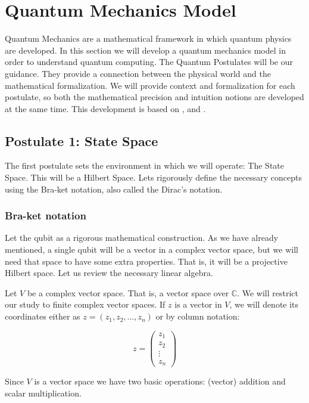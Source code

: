 \section{Quantum Mechanics Model}


Quantum Mechanics are a mathematical framework in which quantum physics are developed. In this section we will develop a quantum mechanics model in order to understand quantum computing. The Quantum Postulates will be our guidance. They provide a connection between the physical world and the mathematical formalization. We will provide context and formalization for each postulate, so both the mathematical precision and intuition notions are developed at the same time. This development is based on \cite{Nielsen2002}, \cite{Manzano2020} and \cite{Bayens2019}.


\subsection{Postulate 1: State Space}


The first postulate sets the environment in which we will operate: The State Space. This will be a Hilbert Space. Lets rigorously define the necessary concepts using the Bra-ket notation, also called the Dirac's notation.


\subsubsection{Bra-ket notation}


Let the qubit as a rigorous mathematical construction. As we have already mentioned, a single qubit will be a vector in a complex vector space, but we will need that space to have some extra properties. That is, it will be a projective Hilbert space. Let us review the necessary linear algebra.

Let $V$ be a complex vector space. That is, a vector space over $\mathds{C}$. We will restrict our study to finite complex vector spaces. If $z$ is a vector in $V$, we will denote its coordinates either as $z = (z_1, z_2, \dotsc, z_n)$ or by column notation:

$$ z = 
\begin{pmatrix}
	z_1\\
	z_2 \\
	\vdots \\
	z_n
\end{pmatrix}
$$

Since $V$ is a vector space we have two basic operations: (vector) addition and scalar multiplication.

